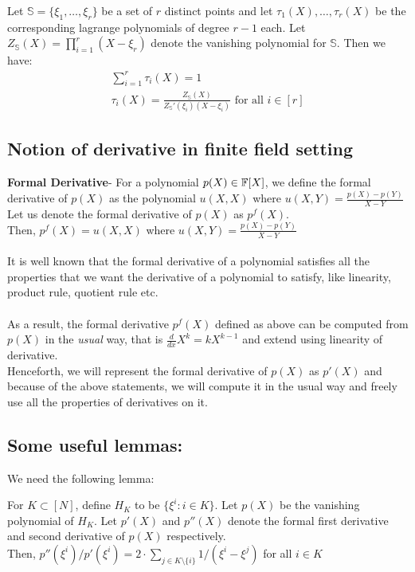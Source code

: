\begin{fact}\label{fc:lagrange}
Let $\mathbb{S}=\{\xi_1,\ldots,\xi_r\}$ be a set of $r$ distinct points and let $\tau_1(X),\ldots,\tau_r(X)$ be
the corresponding lagrange polynomials of degree $r-1$ each. Let $Z_{\mathbb{S}}(X)=\prod_{i=1}^r (X-\xi_r)$ denote the vanishing polynomial
for $\mathbb{S}$. Then we have:
\begin{gather*}
    \sum_{i=1}^r \tau_i(X) = 1 \\
    \tau_i(X) = \frac{Z_{\mathbb{S}}(X)}{Z_{\mathbb{S}}'(\xi_i)(X-\xi_i)} \text{ for all } i\in [r]
\end{gather*}
\end{fact}

\subsection{Notion of derivative in finite field setting}

\textbf{Formal Derivative}- For a polynomial $p(X) \in \mathbb{F}[X]$, we define the formal derivative of $p(X)$ as the polynomial $u(X,X)$ where $u(X,Y)=\frac{p(X)-p(Y)}{X-Y}$\\
Let us denote the formal derivative of $p(X)$ as $p^f(X)$.\\
Then, $p^f(X)= u(X,X)$ where $u(X,Y)=\frac{p(X)-p(Y)}{X-Y}$\\\\
It is well known that the formal derivative of a polynomial satisfies all the properties that we want the derivative of a polynomial to satisfy, like linearity, product rule, quotient rule etc.\\\\
As a result, the formal derivative $p^f(X)$ defined as above can be computed from $p(X)$ in the \textit{usual} way, that is $\frac{d}{dx}X^k=k X^{k-1}$ and extend using linearity of derivative.\\
Henceforth, we will represent the formal derivative of $p(X)$ as $p'(X)$ and because of the above statements, we will compute it in the usual way and freely use all the properties of derivatives on it.\\

\subsection{Some useful lemmas:}

We need the following lemma:\\
\begin{lemma}\label{lem:sumtoder}
For $K\subset [N]$, define $H_K$ to be $\{\xi^i:i \in K\}$. Let $p(X)$ be the vanishing polynomial of $H_{K}$. Let $p'(X)$ and $p''(X)$ denote the formal first derivative and second derivative of $p(X)$ respectively.\\
Then, $p''(\xi^i)/p'(\xi^i)=2 \cdot \sum_{j\in K\setminus \{i\}} 1/(\xi^i-\xi^j)$ for all $i \in K$
\end{lemma}

